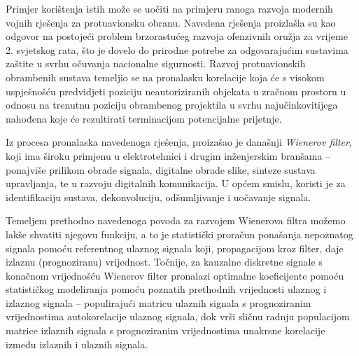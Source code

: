 \documentclass[a4paper,12pt,oneside]{memoir}
\begin{document}
            Primjer korištenja istih može se uočiti na primjeru ranoga razvoja modernih vojnih rješenja za protuavionsku obranu. Navedena rješenja proizlašla su kao odgovor na postojeći problem brzorastućeg razvoja ofenzivnih oružja za vrijeme 2. svjetskog rata, što je dovelo do prirodne potrebe za odgovarajućim sustavima zaštite u svrhu očuvanja nacionalne  sigurnosti. Razvoj protuavionskih obrambenih sustava temeljio se na pronalasku korelacije koja će s visokom uspješnošću predvidjeti poziciju neautoriziranih objekata u zračnom prostoru u odnosu na trenutnu poziciju obrambenog projektila u svrhu najučinkovitijega nahođena koje će rezultirati terminacijom potencijalne prijetnje.
            
            Iz procesa pronalaska navedenoga rješenja, proizašao je današnji \textit{Wienerov filter}, koji ima široku primjenu u elektrotehnici i drugim inženjerskim branšama -- ponajviše prilikom obrade signala, digitalne obrade slike, sinteze sustava upravljanja, te u razvoju digitalnih komunikacija. U općem smislu, koristi je za identifikaciju sustava, dekonvoluciju, odšumljivanje i uočavanje signala.

            Temeljem prethodno navedenoga povoda za razvojem Wienerova filtra možemo lakše shvatiti njegovu funkciju, a to je statistički proračun ponašanja nepoznatog signala pomoću referentnog ulaznog signala koji, propagacijom kroz filter, daje izlaznu (prognoziranu) vrijednost. Točnije, za kauzalne diskretne signale s konačnom vrijednošću Wienerov filter pronalazi optimalne koeficijente pomoću statističkog modeliranja pomoću poznatih prethodnih vrijednosti ulaznog i izlaznog signala -- populirajući matricu ulaznih signala s prognoziranim vrijednostima autokorelacije ulaznog signala, dok vrši sličnu radnju populacijom matrice izlaznih signala s prognoziranim vrijednostima unakrsne korelacije između izlaznih i ulaznih signala.
\end{document}

